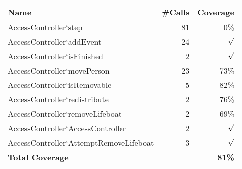 \begin{longtable}{|l|r|r|}\hline
{\bf Name} & {\bf \#Calls} & {\bf Coverage} \\ \hline\hline
\endhead
AccessController`step & 81 & 0\% \\ \hline
AccessController`addEvent & 24 & $\surd$ \\ \hline
AccessController`isFinished & 2 & $\surd$ \\ \hline
AccessController`movePerson & 23 & 73\% \\ \hline
AccessController`isRemovable & 5 & 82\% \\ \hline
AccessController`redistribute & 2 & 76\% \\ \hline
AccessController`removeLifeboat & 2 & 69\% \\ \hline
AccessController`AccessController & 2 & $\surd$ \\ \hline
AccessController`AttemptRemoveLifeboat & 3 & $\surd$ \\ \hline
\hline
{\bf Total Coverage} & & {\bf 81\%} \\ \hline
\end{longtable}

